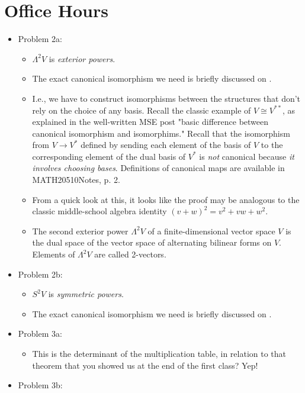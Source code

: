 \documentclass[../notes.tex]{subfiles}
\begin{document}
\section{Office Hours}
\begin{itemize}
    \item {}Problem 2a:
    \begin{itemize}
        \item $\Lambda^2V$ is \emph{exterior powers}.
        \item The exact canonical isomorphism we need is briefly discussed on \textcite[473]{bib:FultonHarris}.
        \item I.e., we have to construct isomorphisms between the structures that don't rely on the choice of any basis. Recall the classic example of $V\cong V^{**}$, as explained in the well-written MSE post "basic difference between canonical isomorphism and isomorphims." Recall that the isomorphism from $V\to V^*$ defined by sending each element of the basis of $V$ to the corresponding element of the dual basis of $V^*$ is \emph{not} canonical because \emph{it involves choosing bases}. Definitions of canonical maps are available in MATH20510Notes, p. 2.
        \item From a quick look at this, it looks like the proof may be analogous to the classic middle-school algebra identity $(v+w)^2=v^2+vw+w^2$.
        \item The second exterior power $\Lambda^2V$ of a finite-dimensional vector space $V$ is the dual space of the vector space of alternating bilinear forms on $V$. Elements of $\Lambda^2V$ are called 2-vectors.
    \end{itemize}
    \item Problem 2b:
    \begin{itemize}
        \item $S^2V$ is \emph{symmetric powers}.
        \item The exact canonical isomorphism we need is briefly discussed on \textcite[473]{bib:FultonHarris}.
    \end{itemize}
    \item Problem 3a:
    \begin{itemize}
        \item This is the determinant of the multiplication table, in relation to that theorem that you showed us at the end of the first class? Yep!
    \end{itemize}
    \item Problem 3b:
    \begin{itemize}

\end{itemize}
\end{itemize}
\end{document}
